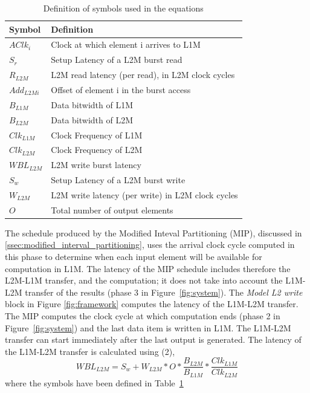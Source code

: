 \begin{table}[]
\centering
\footnotesize
\begin{tabular}{|l|l|}
\hline
\textbf{Symbol} & \textbf{Definition}                                           \\ \hline
$AClk_i$           & Clock at which element i arrives to L1M                \\
$S_r$             & Setup Latency of a L2M burst read                          \\
$R_{L2M}$       & L2M read latency (per read), in L2M clock cycles   \\
$Add_{L2Mi}$     & Offset of element i in the burst access \\
$B_{L1M}$        & Data bitwidth of L1M                                       \\
$B_{L2M}$        & Data bitwidth of L2M                                       \\
$Clk_{L1M}$      & Clock Frequency of L1M                                     \\
$Clk_{L2M}$      & Clock Frequency of L2M                                     \\
$WBL_{L2M}$      & L2M write burst latency                                    \\
$S_w$             & Setup Latency of a L2M burst write                         \\
$W_{L2M}$       & L2M write latency (per write) in L2M clock cycles  \\
$O$                 & Total number of output elements                            \\ \hline
\end{tabular}
\caption{\small Definition of symbols used in the equations}
\label{table:equation}
\end{table}
The schedule produced by the Modified Inteval Partitioning (MIP), discussed in \ref{ssec:modified_interval_partitioning}, uses the arrival clock cycle computed in this phase to determine when each input element will be available for computation in L1M. The latency of the MIP schedule includes therefore the L2M-L1M transfer, and the computation; it does not take into account the L1M-L2M transfer of the results (phase 3 in Figure~\ref{fig:system}).
The \textit{Model L2 write} block in Figure \ref{fig:framework} computes the latency of the L1M-L2M transfer. The MIP computes the clock cycle at which computation ends (phase 2 in Figure~\ref{fig:system}) and the last data item is written in L1M. The L1M-L2M transfer can start immediately after the last output is generated.
The latency of the L1M-L2M transfer is calculated using (2),
\begin{equation}
    WBL_{L2M} = S_w + W_{L2M} * O * \frac{B_{L2M}}{B_{L1M}} * \frac{Clk_{L1M}}{Clk_{L2M}}
\end{equation}
where the symbols have been defined in Table~\ref{table:equation}


